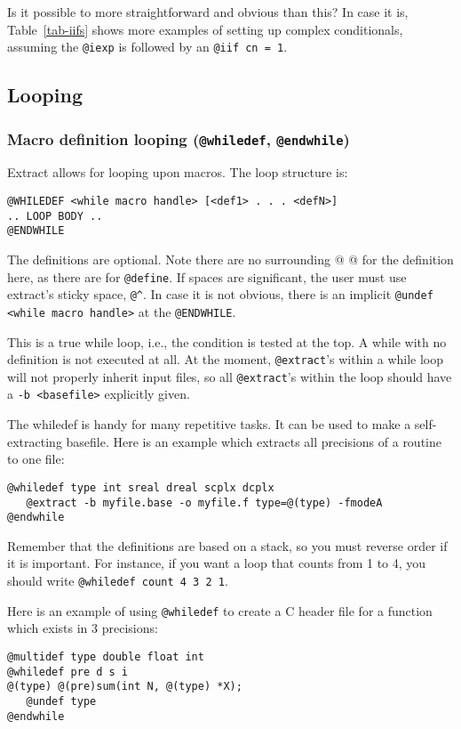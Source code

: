 Is it possible to more straightforward and obvious than this?  
In case
it is, Table~\ref{tab-iifs} shows more examples of setting up complex
conditionals, assuming the {\tt @iexp} is followed by an {\tt @iif cn = 1}.

\subsection{Looping}

\subsubsection{Macro definition looping ({\tt @whiledef}, {\tt @endwhile})}
\label{sec-whiledef}
Extract allows for looping upon macros.  The loop structure is:
\begin{verbatim}
@WHILEDEF <while macro handle> [<def1> . . . <defN>]
.. LOOP BODY ..
@ENDWHILE
\end{verbatim}
The definitions are optional.  Note there are no surrounding @ @ for the
definition here, as there are for {\tt @define}.  If 
spaces are significant, the user must use extract's sticky space, \verb+@^+.
In case it is not obvious, there is an implicit
{\tt @undef <while macro handle>} at the {\tt @ENDWHILE}.

This is a true while loop, i.e., the condition is tested at the top.  A
while with no definition is not executed at all.  At the moment,
{\tt @extract}'s within a while loop will not properly inherit input
files, so all {\tt @extract}'s within the loop should have a 
{\tt -b <basefile>} explicitly given.

The whiledef is handy for many repetitive tasks.  It can be used to make
a self-extracting basefile.
Here is an example which extracts all precisions of a routine to one file:
\begin{verbatim}
@whiledef type int sreal dreal scplx dcplx
   @extract -b myfile.base -o myfile.f type=@(type) -fmodeA
@endwhile
\end{verbatim}

Remember that the definitions are based on a stack, so you
must reverse order if it is important.  For instance, if you want
a loop that counts from 1 to 4, you should write 
{\tt @whiledef count 4 3 2 1}.

\noindent
Here is an example of using {\tt @whiledef} to create a C header file for
a function which exists in 3 precisions:
\begin{verbatim}
@multidef type double float int
@whiledef pre d s i
@(type) @(pre)sum(int N, @(type) *X);
   @undef type
@endwhile
\end{verbatim}

